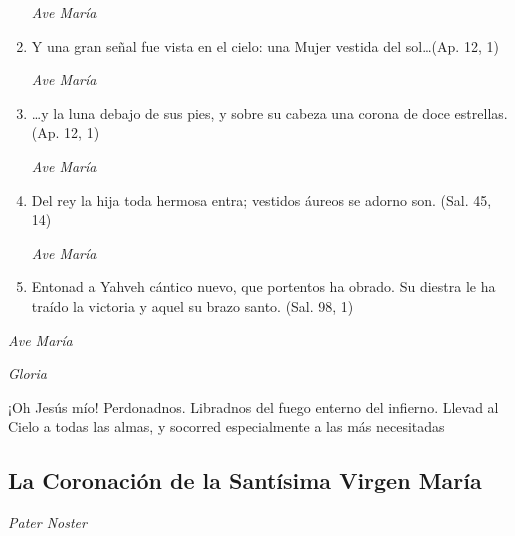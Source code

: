 \documentclass[a4paper,11pt, oneside]{report}
\begin{document}
\begin{enumerate}
          \textit{Ave María}

          \item Y una gran señal fue vista en el cielo: una Mujer vestida del sol\ldots (Ap. 12, 1)

          \textit{Ave María}

          \item {\ldots}y la luna debajo de sus pies, y sobre su cabeza una corona de doce estrellas. (Ap. 12, 1)

          \textit{Ave María}

          \item Del rey la hija toda hermosa entra; vestidos áureos se adorno son. (Sal. 45, 14)

          \textit{Ave María}

          \item Entonad a Yahveh cántico nuevo, que portentos ha obrado. Su diestra le ha traído la victoria y aquel su brazo santo. (Sal. 98, 1)

        \end{enumerate}

        \textit{Ave María} \par
        \indent\textit{Gloria} \par
        \indent¡Oh Jesús mío! Perdonadnos. Libradnos del fuego enterno del infierno. Llevad al Cielo a todas las almas, y socorred especialmente a las más 
        necesitadas

      \subsection*{La Coronación de la Santísima Virgen María}

        \textit{Pater Noster}
\end{document}
